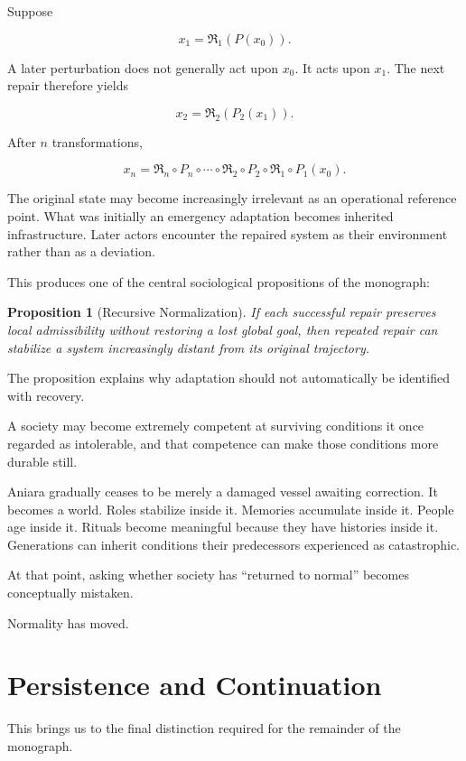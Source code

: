 \documentclass[11pt,oneside]{book}
\newtheorem{proposition}[theorem]{Proposition}
\theoremstyle{definition}
\theoremstyle{remark}
\newcommand{\Repair}{\mathfrak{R}}
\begin{document}
Suppose

\[
x_1=\Repair_1(P(x_0)).
\]

A later perturbation does not generally act upon \(x_0\). It acts upon \(x_1\). The next repair therefore yields

\[
x_2=\Repair_2(P_2(x_1)).
\]

After \(n\) transformations,

\[
x_n
=
\Repair_n
\circ P_n
\circ\cdots\circ
\Repair_2
\circ P_2
\circ
\Repair_1
\circ P_1(x_0).
\]

The original state may become increasingly irrelevant as an operational reference point. What was initially an emergency adaptation becomes inherited infrastructure. Later actors encounter the repaired system as their environment rather than as a deviation.

This produces one of the central sociological propositions of the monograph:

\begin{proposition}[Recursive Normalization]
If each successful repair preserves local admissibility without restoring a lost global goal, then repeated repair can stabilize a system increasingly distant from its original trajectory.
\end{proposition}

The proposition explains why adaptation should not automatically be identified with recovery.

A society may become extremely competent at surviving conditions it once regarded as intolerable, and that competence can make those conditions more durable still.

Aniara gradually ceases to be merely a damaged vessel awaiting correction. It becomes a world. Roles stabilize inside it. Memories accumulate inside it. People age inside it. Rituals become meaningful because they have histories inside it. Generations can inherit conditions their predecessors experienced as catastrophic.

At that point, asking whether society has ``returned to normal'' becomes conceptually mistaken.

Normality has moved.

\section{Persistence and Continuation}

This brings us to the final distinction required for the remainder of the monograph.
\end{document}
